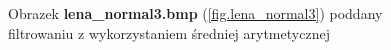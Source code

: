 \documentclass{classrep}
\begin{document}
\begin{figure}
{{  \label{fig.lena_normal3_average_5x5}
 }
}
\caption{Obrazek \textbf{lena\_normal3.bmp} (\ref{fig.lena_normal3}) poddany filtrowaniu z wykorzystaniem średniej arytmetycznej}
\label{fig.lena_normal3_average}
\end{figure}
\end{document}
